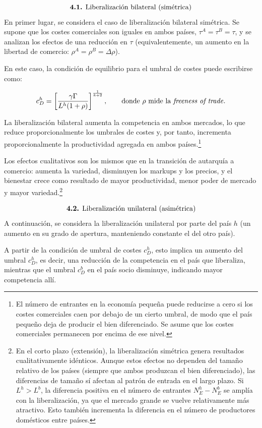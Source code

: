 \documentclass[10pt,a4paper]{article}
\begin{document}
$$\text{\textbf{4.1.} Liberalización bilateral (simétrica)}$$
En primer lugar, se considera el caso de liberalización bilateral simétrica. Se supone que los costes comerciales son iguales en ambos países, $\tau^A = \tau^B = \tau$, y se analizan los efectos de una reducción en $\tau$ (equivalentemente, un aumento en la libertad de comercio: $\rho^A=\rho^B=\Delta\rho$). 

En este caso, la condición de equilibrio para el umbral de costes puede escribirse como:

$$c_D^h = \left[\frac{\gamma\Gamma}{L^h (1 +\rho)}\right]^{\frac{1}{k+2}},\qquad
\text{donde $\rho$ mide la \textit{freeness of trade}}.$$

La liberalización bilateral aumenta la competencia en ambos mercados, lo que reduce proporcionalmente los umbrales de costes y, por tanto, incrementa proporcionalmente la productividad agregada en ambos países.\footnote{%
    El número de entrantes en la economía pequeña puede reducirse a cero si los costes comerciales caen por debajo de un cierto umbral, de modo que el país pequeño deja de producir el bien diferenciado. Se asume que los costes comerciales permanecen por encima de ese nivel.
} 

Los efectos cualitativos son los mismos que en la transición de autarquía a comercio: aumenta la variedad, disminuyen los markups y los precios, y el bienestar crece como resultado de mayor productividad, menor poder de mercado y mayor variedad.\footnote{%
    En el corto plazo (extensión), la liberalización simétrica genera resultados cualitativamente idénticos. Aunque estos efectos no dependen del tamaño relativo de los países (siempre que ambos produzcan el bien diferenciado), las diferencias de tamaño sí afectan al patrón de entrada en el largo plazo. Si $L^h > L^b$, la diferencia positiva en el número de entrantes $N_E^h - N_E^b$ se amplía con la liberalización, ya que el mercado grande se vuelve relativamente más atractivo. Esto también incrementa la diferencia en el número de productores domésticos entre países.
}

$$\text{\textbf{4.2.} Liberalización unilateral (asimétrica)}$$
A continuación, se considera la liberalización unilateral por parte del país $h$ (un aumento en su grado de apertura, manteniendo constante el del otro país). 

A partir de la condición de umbral de costes $c_D^h$, esto implica un aumento del umbral $c_D^h$, es decir, una reducción de la competencia en el país que liberaliza, mientras que el umbral $c_D^b$ en el país socio disminuye, indicando mayor competencia allí. 
\end{document}

